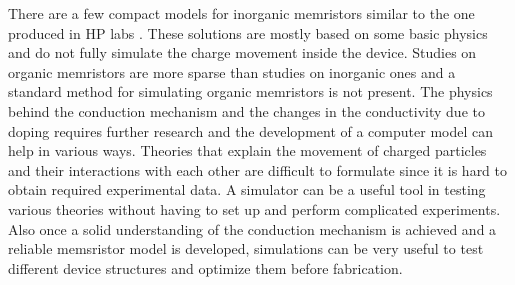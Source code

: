 \begin{doublespace}
There are a few compact models for inorganic memristors similar to the one produced in HP labs \cite{ChuaSim}\cite{MemCircuitSim}. These solutions are mostly based on some basic physics and do not fully simulate the charge movement inside the device. Studies on organic memristors are more sparse than studies on inorganic ones and a standard method for simulating organic memristors is not present. The physics behind the conduction mechanism and the changes in the conductivity due to doping requires further research and the development of a computer model can help in various ways. Theories that explain the movement of charged particles and their interactions with each other are difficult to formulate since it is hard to obtain required experimental data. A simulator can be a useful tool in testing various theories without having to set up and perform complicated experiments. Also once a solid understanding of the conduction mechanism is achieved and a reliable memsristor model is developed, simulations can be very useful to test different device structures and optimize them before fabrication. 


 \end{doublespace}